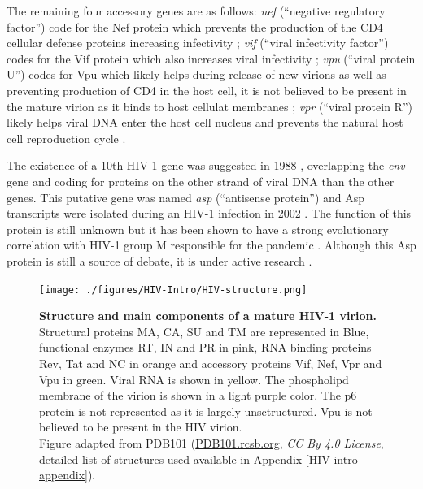 \documentclass[
  11pt,
  twoside]{scrbook}
\newcommand{\extcaption}[2]{
    \caption[#1]{
        \textbf{#1}\newline
        #2
    }
}
\begin{document}
The remaining four accessory genes are as follows: \emph{nef} (``negative regulatory factor'') code for the Nef protein which prevents the production of the CD4 cellular defense proteins increasing infectivity \autocite{mangasarianMultifacetedRoleHIV1997}; \emph{vif} (``viral infectivity factor'') codes for the Vif protein which also increases viral infectivity \autocite{cohenRoleAuxiliaryProteins1996}; \emph{vpu} (``viral protein U'') codes for Vpu which likely helps during release of new virions \autocite{lambVpuVprHuman1997,cohenRoleAuxiliaryProteins1996} as well as preventing production of CD4 in the host cell, it is not believed to be present in the mature virion as it binds to host cellulat membranes \autocite{khanRoleViralProtein2021}; \emph{vpr} (``viral protein R'') likely helps viral DNA enter the host cell nucleus and prevents the natural host cell reproduction cycle \autocite{emermanHIV1VprCell1996}.

The existence of a 10th HIV-1 gene was suggested in 1988 \autocite{millerHumanImmunodeficiencyVirus1988}, overlapping the \emph{env} gene and coding for proteins on the other strand of viral DNA than the other genes. This putative gene was named \emph{asp} (``antisense protein'') and Asp transcripts were isolated during an HIV-1 infection in 2002 \autocite{briquetImmunolocalizationStudiesAntisense2002}. The function of this protein is still unknown but it has been shown to have a strong evolutionary correlation with HIV-1 group M responsible for the pandemic \autocite{cassanConcomitantEmergenceAntisense2016}. Although this Asp protein is still a source of debate, it is under active research \autocite{savoretPilotStudyHumoral2020}.

\begin{figure}
  \centering
  \texttt{[image: ./figures/HIV-Intro/HIV-structure.png]}
  \extcaption{Structure and main components of a mature HIV-1 virion.}{Structural proteins MA, CA, SU and TM are represented in Blue, functional enzymes RT, IN and PR in pink, RNA binding proteins Rev, Tat and NC in orange and accessory proteins Vif, Nef, Vpr and Vpu in green. Viral RNA is shown in yellow. The phospholipd membrane of the virion is shown in a light purple color. The p6 protein is not represented as it is largely unsctructured. Vpu is not believed to be present in the HIV virion. \\
Figure adapted from PDB101 \autocite{zardecki2022} (\href{https://PDB101.rcsb.org}{PDB101.rcsb.org}, \textit{CC By 4.0 License}, detailed list of structures used available in Appendix \autoref{HIV-intro-appendix}).}
\label{fig:hivStructure}
\end{figure}
\end{document}
